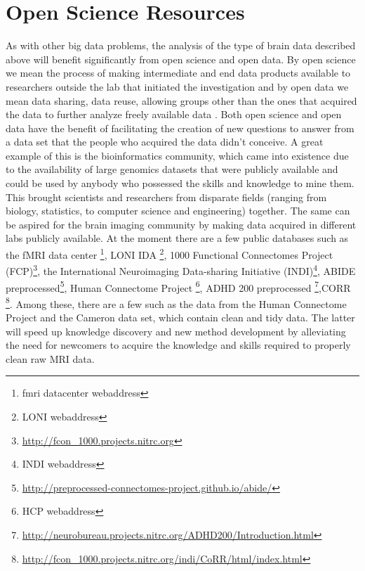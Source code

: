 \section{Open Science Resources}

As with other big data problems, the analysis of the type of brain data
described above will benefit significantly from open science and open data. By
open science we mean the process of making intermediate and end data products
available to researchers outside the lab that initiated the investigation and
by open data we mean data sharing, data reuse, allowing groups other than the
ones that acquired the data to further analyze freely available data
\cite{Milham2012}. Both open science and open data have the benefit of
facilitating the creation of new questions to answer from a data set that the
people who acquired the data didn't conceive. A great example of this is the
bioinformatics community, which came into existence due to the availability of
large genomics datasets that were publicly available and could be used by
anybody who possessed the skills and knowledge to mine them\cite{VanHorn2013}.
This brought scientists and researchers from disparate fields (ranging from
biology, statistics, to computer science and engineering) together. The same
can be aspired for the brain imaging community by making data acquired in
different labs publicly available. At the moment there are a few public
databases such as the fMRI data center \footnote{fmri datacenter webaddress},
LONI IDA \footnote{LONI webaddress}, 1000 Functional Connectomes Project
(FCP)\footnote{\url{http://fcon_1000.projects.nitrc.org}}, the International
Neuroimaging Data-sharing Initiative (INDI)\footnote{INDI webaddress}, ABIDE
preprocessed\footnote{\url{http://preprocessed-connectomes-project.github.io/abide/}},
Human Connectome Project \footnote{HCP webaddress}, ADHD 200 preprocessed
\footnote{\url{http://neurobureau.projects.nitrc.org/ADHD200/Introduction.html}},CORR
\footnote{\url{http://fcon_1000.projects.nitrc.org/indi/CoRR/html/index.html}}.
Among these, there are a few such as the data from the Human Connectome Project
and the Cameron data set, which contain clean and tidy data. The latter will
speed up knowledge discovery and new method development by alleviating the need
for newcomers to acquire the knowledge and skills required to properly clean
raw MRI data. 
